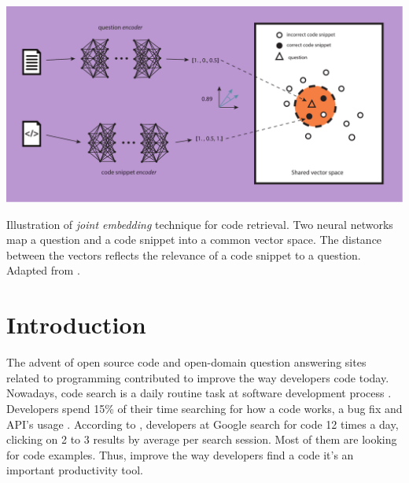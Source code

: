 \documentclass[sigconf]{acmart}
\begin{document}



\begin{teaserfigure}
  \includegraphics[width=\textwidth]{figuras/joint_embedding-article.pdf}
  \caption{Illustration of \emph{joint embedding} technique for code retrieval. Two neural networks map a question and a code snippet into a common vector space. The distance between the vectors reflects the relevance of a code snippet to a question. Adapted from \cite{cambronero-deep-code-search-2019}.}
  \label{fig:joint-embedding}
\end{teaserfigure}

\maketitle

\section{Introduction}

The advent of open source code and open-domain question answering sites related to programming contributed to improve the way developers code today. Nowadays, code search is a daily routine task at software development process \citep{towards-summarizing-source-code-search:marin:2020}. Developers spend 15\% of their time searching for how a code works, a bug fix and API's usage \cite{what-developers-search-for-on-the-web:xia:2017}. According to \cite{sadowski-how-developers-search-for-code-case-study:2015}, developers at Google search for code 12 times a day, clicking on 2 to 3 results by average per search session. Most of them are looking for code examples. Thus, improve the way developers find a code it's an important productivity tool.  
\end{document}
